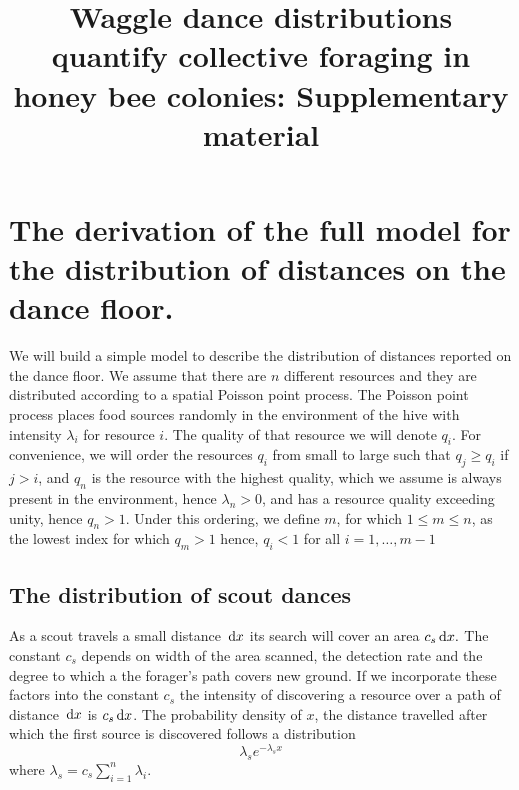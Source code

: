 \documentclass[12pt,letter]{amsart}
\newcommand{\df}[0]{{\,\rm d }}
\begin{document}


\vspace*{-7mm}

\title{Waggle dance distributions quantify collective foraging in honey bee colonies: Supplementary material}
\maketitle



\section*{The derivation of the full model for the distribution of distances on the dance floor. }

We will build a simple model to describe the distribution of distances reported on the dance floor. We assume that there are $n$ different resources and they are distributed according to a spatial Poisson point process. The Poisson point process places food sources randomly in the environment of the hive with intensity $\lambda_i$ for resource $i$. The quality of that resource we will denote $q_i.$ For convenience, we will order the resources $q_i$ from small to large such that $q_j \ge q_i$ if $j>i$, and $q_n$ is the resource with the highest quality, which we assume is always present in the environment, hence $\lambda_n>0$, and has a resource quality exceeding unity, hence $q_n>1$. Under this ordering, we define $m$, for which $1\le m\le n$, as the lowest index for which $q_m>1$ hence, $q_i<1$ for all $i=1, \dots, m-1$

\subsection*{The distribution of scout dances}

As a scout travels a small distance $\df x$ its search will cover an area $c_s \df x.$ The constant $c_s$ depends on width of the area scanned, the detection rate and the degree to which a the forager's path covers new ground. If we incorporate these factors into the constant $c_s$ the intensity of discovering a resource over a path of distance $\df x$ is  $c_s \df x$. The probability density of $x$, the distance travelled after which the first source is discovered follows a distribution
$$\lambda_s e^{-\lambda_s x}$$
where $\lambda_s= c_s\sum_{i =1}^n\lambda_i.$
\end{document}
